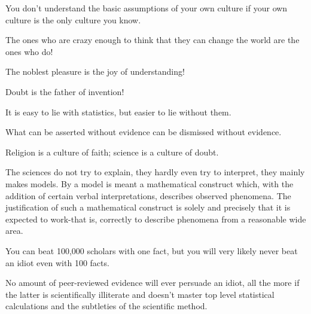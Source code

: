  	\begin{fquote} You don't understand the basic assumptions of your own culture if your own culture is the only culture you know.
 	\end{fquote}
 	
 	\begin{fquote}The ones who are crazy enough to think that they can change the world are the ones who do!
 	\end{fquote}
 	
 	\begin{fquote}The noblest pleasure is the joy of understanding!
 	\end{fquote}
 	
 	\begin{fquote}Doubt is the father of invention!
 	\end{fquote}
 	
 	\begin{fquote}It is easy to lie with statistics, but easier to lie without them.
 	\end{fquote}
 	
 	\begin{fquote}What can be asserted without evidence can be dismissed without evidence.
 	\end{fquote}
 	
 	\begin{fquote}Religion is a culture of faith; science is a culture of doubt.
 	\end{fquote}
 	
 	\begin{fquote}The sciences do not try to explain, they hardly even try to interpret, they mainly makes models. By a model is meant a mathematical construct which, with the addition of certain verbal interpretations, describes observed phenomena. The justification of such a mathematical construct is solely and precisely that it is expected to work-that is, correctly to describe phenomena from a reasonable wide area.
 	\end{fquote}
 	
 	\begin{fquote}You can beat 100,000 scholars with one fact, but you will very likely never beat an idiot even with 100 facts.
 	\end{fquote}
 	
 	\begin{fquote}No amount of peer-reviewed evidence will ever persuade an idiot, all the more if the latter is scientifically illiterate and doesn't master top level statistical calculations and the subtleties of the scientific method.
 	\end{fquote}
 	
